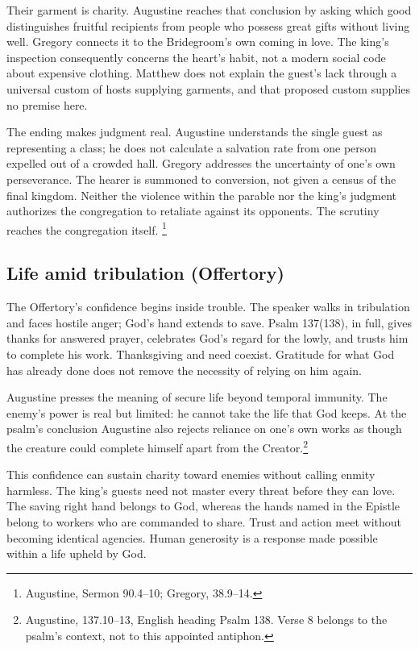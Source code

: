 Their garment is charity. Augustine reaches that conclusion by asking
which good distinguishes fruitful recipients from people who possess
great gifts without living well. Gregory connects it to the Bridegroom's
own coming in love. The king's inspection consequently concerns the
heart's habit, not a modern social code about expensive clothing. Matthew
does not explain the guest's lack through a universal custom of hosts
supplying garments, and that proposed custom supplies no premise here.

The ending makes judgment real. Augustine understands the single guest
as representing a class; he does not calculate a salvation rate from one
person expelled out of a crowded hall. Gregory addresses the uncertainty
of one's own perseverance. The hearer is summoned to conversion, not
given a census of the final kingdom. Neither the violence within the
parable nor the king's judgment authorizes the congregation to retaliate
against its opponents. The scrutiny reaches the congregation itself.
\footnote{Augustine, Sermon 90.4--10; Gregory, 
38.9--14.}

\subsection{Life amid tribulation (Offertory)}

The Offertory's confidence begins inside trouble. The speaker walks in
tribulation and faces hostile anger; God's hand extends to save.
Psalm 137(138), in full, gives thanks for answered prayer, celebrates
God's regard for the lowly, and trusts him to complete his work.
Thanksgiving and need coexist. Gratitude for what God has already done
does not remove the necessity of relying on him again.

Augustine presses the meaning of secure life beyond temporal immunity.
The enemy's power is real but limited: he cannot take the life that God
keeps. At the psalm's conclusion Augustine also rejects reliance on
one's own works as though the creature could complete himself apart
from the Creator.\footnote{Augustine,  137.10--13,
English heading Psalm 138. Verse 8 belongs to the psalm's context, not
to this appointed antiphon.}

This confidence can sustain charity toward enemies without calling
enmity harmless. The king's guests need not master every threat before
they can love. The saving right hand belongs to God, whereas the hands
named in the Epistle belong to workers who are commanded to share.
Trust and action meet without becoming identical agencies. Human
generosity is a response made possible within a life upheld by God.

